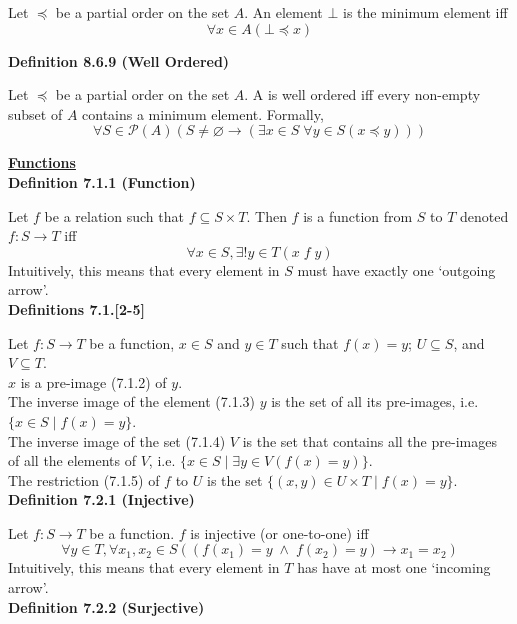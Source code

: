 \documentclass[a4paper]{article}
\newcommand{\heading}[1]{{\small\underline{\textbf{#1}}}}
\newcommand{\subheading}[1]{{\scriptsize\textbf{#1}}}
\begin{document}
\begin{multicols*}{4}
Let $\preceq$ be a partial order on the set $A$. An element $\bot$ is the
minimum element iff $$\forall x \in A (\bot \preceq x)$$

\subheading{Definition 8.6.9 (Well Ordered)}

Let $\preceq$ be a partial order on the set $A$. A is well ordered iff every
non-empty subset of $A$ contains a minimum element. Formally,
$$\forall S \in \mathcal{P}(A) (S \neq \varnothing \rightarrow
  (\exists x \in S\;\forall y \in S(x \preceq y)))$$

\heading{Functions} \\

\subheading{Definition 7.1.1 (Function)}

Let $f$ be a relation such that $f \subseteq S \times T$. Then $f$ is a function
from $S$ to $T$ denoted $f: S\rightarrow T$ iff
$$\forall x \in S, \exists! y \in T(x\;f\;y)$$
Intuitively, this means that every element in $S$ must have exactly one
`outgoing arrow'.\\

\subheading{Definitions 7.1.[2-5]}

Let $f : S \rightarrow T$ be a function, $x \in S$ and $y \in T$ such that
$f(x)=y$; $U \subseteq S$, and $V \subseteq T$.\\

$x$ is a pre-image (7.1.2) of $y$.\\

The inverse image of the element (7.1.3) $y$ is the set of all its pre-images,
i.e. $\{x \in S\;|\;f(x) = y\}$.\\

The inverse image of the set (7.1.4) $V$ is the set that contains all the
pre-images of all the elements of $V$, i.e.
$\{x \in S\;|\;\exists y \in V (f(x) = y)\}$.\\

The restriction (7.1.5) of $f$ to $U$ is the set
$\{(x, y) \in U \times T\;|\;f(x)=y\}$.\\

\subheading{Definition 7.2.1 (Injective)}

Let $f : S \rightarrow T$ be a function. $f$ is injective (or one-to-one) iff
$$\forall y \in T, \forall x_1, x_2 \in S (
  (f(x_1) = y\;\land\;f(x_2) = y) \rightarrow x_1 = x_2)$$
Intuitively, this means that every element in $T$ has have at most one `incoming
arrow'.\\

\subheading{Definition 7.2.2 (Surjective)}


\end{multicols*}
\end{document}
